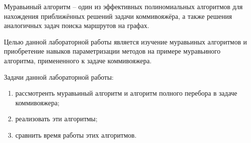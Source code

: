 \Introduction
    Муравьиный алгоритм -- один из эффективных
    полиномиальных алгоритмов для нахождения 
    приближённых решений задачи коммивояжёра, 
    а также решения аналогичных задач поиска маршрутов на графах.
        
    Целью данной лабораторной работы является
    изучение муравьиных алгоритмов и приобретение
    навыков параметризации методов на примере
    муравьиного алгоритма, примененного к задаче коммивояжера.
        
    Задачи данной лабораторной работы:
    \begin{enumerate}
        \item рассмотренть муравьиный алгоритм и алгоритм полного перебора в задаче коммивояжера;
        \item реализовать эти алгоритмы;
        \item сравнить время работы этих алгоритмов.
    \end{enumerate}

\newpage